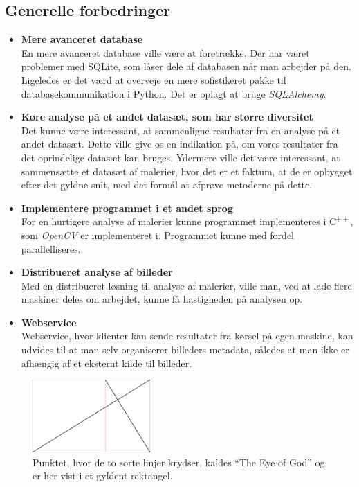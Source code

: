 {\subsection{Generelle forbedringer}
\begin{itemize}
    \item \textbf{Mere avanceret database}\\
        En mere avanceret database ville være at foretrække. Der har
        været problemer med SQLite, som låser dele af databasen når man
        arbejder på den. Ligeledes er det værd at overveje en mere
        sofistikeret pakke til databasekommunikation i Python. Det er
        oplagt at bruge \emph{SQLAlchemy}\cite{SQLAlchemy}.
    \item \textbf{Køre analyse på et andet datasæt, som har større diversitet}\\
        Det kunne være interessant, at sammenligne resultater fra en
        analyse på et andet datasæt. Dette ville give os en indikation
		på, om vores resultater fra det oprindelige datasæt kan bruges.
        Ydermere ville det være interessant, at sammensætte et datasæt
        af malerier, hvor det er et faktum, at de er opbygget efter det
        gyldne snit, med det formål at afprøve metoderne på dette.
    \item \textbf{Implementere programmet i et andet sprog}\\
        For en hurtigere analyse af malerier kunne programmet
        implementeres i $\textrm{C}^{++}$, som \emph{OpenCV} er
        implementeret i. Programmet kunne med fordel parallelliseres.
    \item \textbf{Distribueret analyse af billeder}\\
        Med en distribueret løsning til analyse af malerier, ville man,
        ved at lade flere maskiner deles om arbejdet, kunne få
        hastigheden på analysen op.
    \item \textbf{Webservice}\\
        Webservice, hvor klienter kan sende resultater fra kørsel på
        egen maskine, kan udvides til at man selv organiserer billeders
        metadata, således at man ikke er afhængig af et eksternt
        kilde til billeder.
\end{itemize}

\begin{figure}[!h]
    \centering
    \includegraphics[angle=0,width=0.4\textwidth]{afsnit/fremtidigt_arbejde/billeder/eye_of_god}
    \caption[]{Punktet, hvor de to sorte linjer krydser, kaldes ``The Eye
    of God'' og er her vist i et gyldent rektangel.}
    \label{eye_of_god}
\end{figure}

}
